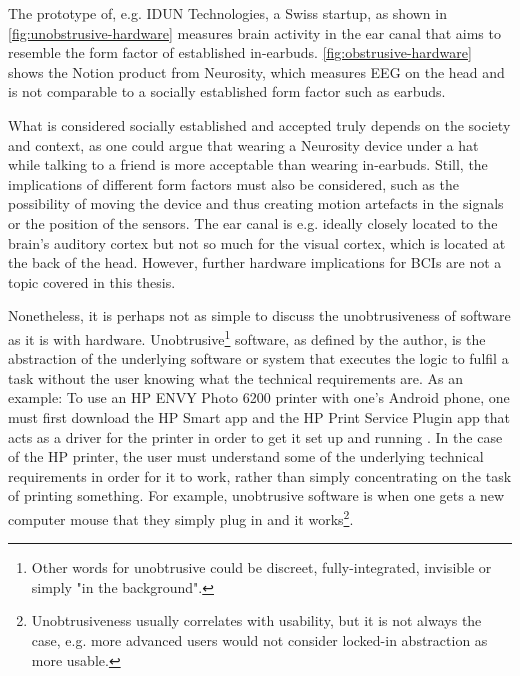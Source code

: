 The prototype of, e.g. IDUN Technologies, a Swiss startup, as shown in \autoref{fig:unobstrusive-hardware} measures brain activity in the ear canal that aims to resemble the form factor of established in-earbuds. \autoref{fig:obstrusive-hardware} shows the Notion product from Neurosity, which measures EEG on the head and is not comparable to a socially established form factor such as earbuds.

What is considered socially established and accepted truly depends on the society and context, as one could argue that wearing a Neurosity device under a hat while talking to a friend is more acceptable than wearing in-earbuds. Still, the implications of different form factors must also be considered, such as the possibility of moving the device and thus creating motion artefacts in the signals or the position of the sensors. The ear canal is e.g. ideally closely located to the brain's auditory cortex but not so much for the visual cortex, which is located at the back of the head. However, further hardware implications for BCIs are not a topic covered in this thesis.

Nonetheless, it is perhaps not as simple to discuss the unobtrusiveness of software as it is with hardware. Unobtrusive\footnote{Other words for unobtrusive could be discreet, fully-integrated, invisible or simply "in the background".} software, as defined by the author, is the abstraction of the underlying software or system that executes the logic to fulfil a task without the user knowing what the technical requirements are. As an example: To use an HP ENVY Photo 6200 printer with one's Android phone, one must first download the HP Smart app and the HP Print Service Plugin app that acts as a driver for the printer in order to get it set up and running \citep{hp_hp_nodate}. In the case of the HP printer, the user must understand some of the underlying technical requirements in order for it to work, rather than simply concentrating on the task of printing something. For example, unobtrusive software is when one gets a new computer mouse that they simply plug in and it works\footnote{Unobtrusiveness usually correlates with usability, but it is not always the case, e.g. more advanced users would not consider locked-in abstraction as more usable.}.


